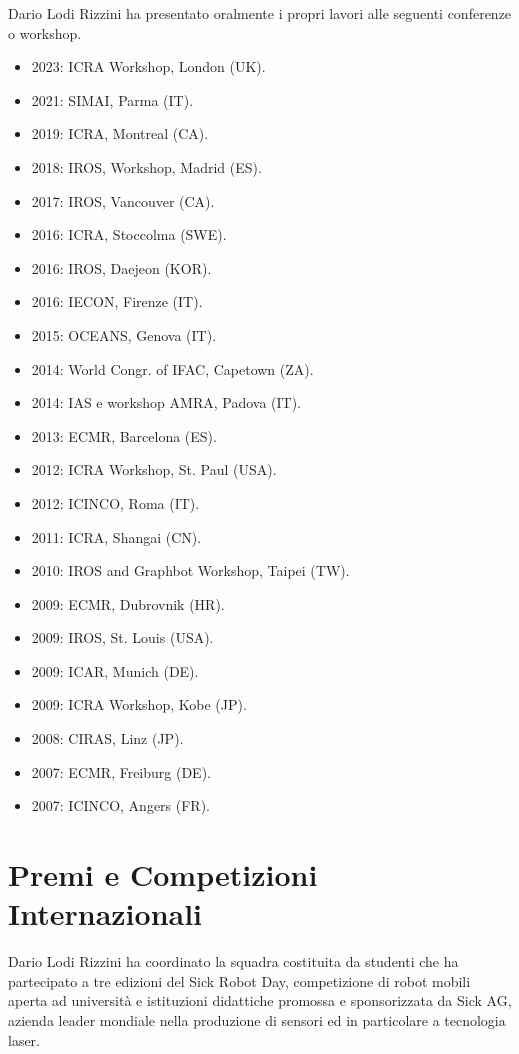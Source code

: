 \documentclass[11pt]{article}
\begin{document}
Dario Lodi Rizzini ha presentato oralmente i propri lavori alle seguenti conferenze o workshop.
\begin{itemize}
\item 2023: ICRA Workshop, London (UK). 
\item 2021: SIMAI, Parma (IT). 
\item 2019: ICRA, Montreal (CA).
\item 2018: IROS, Workshop, Madrid (ES).
\item 2017: IROS, Vancouver (CA).
\item 2016: ICRA, Stoccolma (SWE).
\item 2016: IROS, Daejeon (KOR).
\item 2016: IECON, Firenze (IT).
\item 2015: OCEANS, Genova (IT).
\item 2014: World Congr. of IFAC, Capetown (ZA).
\item 2014: IAS e workshop AMRA, Padova (IT).
\item 2013: ECMR, Barcelona (ES). 
\item 2012: ICRA Workshop, St. Paul (USA). 
\item 2012: ICINCO, Roma (IT). 
\item 2011: ICRA, Shangai (CN). 
\item 2010: IROS and Graphbot Workshop, Taipei (TW).
\item 2009: ECMR, Dubrovnik (HR).
\item 2009: IROS, St. Louis (USA).
\item 2009: ICAR, Munich (DE).
\item 2009: ICRA Workshop, Kobe (JP).
\item 2008: CIRAS, Linz (JP).
\item 2007: ECMR, Freiburg (DE).
\item 2007: ICINCO, Angers (FR).
\end{itemize}


\section*{Premi e Competizioni Internazionali}

Dario Lodi Rizzini ha coordinato la squadra costituita da studenti che ha partecipato a tre edizioni del Sick Robot Day,
competizione di robot mobili aperta ad universit\`a e istituzioni didattiche promossa e sponsorizzata 
da Sick AG, azienda leader mondiale nella produzione di sensori ed in particolare a tecnologia laser. 
\end{document}
